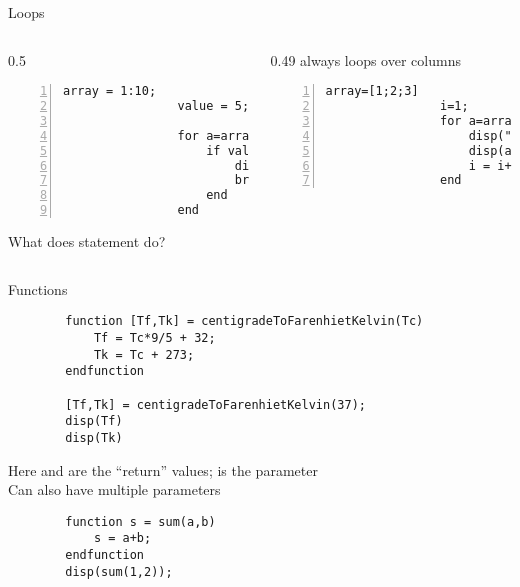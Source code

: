 \begin{frame}[fragile]{Loops}
    \begin{columns}
        \begin{column}{0.5\linewidth}
            \begin{lstlisting}[numbers=left]
                array = 1:10;
                value = 5;
                
                for a=array
                    if value==a then
                        disp("Value exists in array");
                        break;
                    end
                end
            \end{lstlisting}
            What does  statement do?
        \end{column}
        \begin{column}{0.49\linewidth}
            \scilab{} always loops over columns
            \begin{lstlisting}[numbers=left]
                array=[1;2;3]
                i=1;
                for a=array
                    disp("Element " + string(i) + ":")
                    disp(a)
                    i = i+1;
                end
            \end{lstlisting}
        \end{column}
    \end{columns}
\end{frame}

\begin{frame}[fragile]{Functions}
    \begin{lstlisting}
        function [Tf,Tk] = centigradeToFarenhietKelvin(Tc)
            Tf = Tc*9/5 + 32;
            Tk = Tc + 273;
        endfunction
        
        [Tf,Tk] = centigradeToFarenhietKelvin(37);
        disp(Tf)
        disp(Tk)
    \end{lstlisting}
    Here  and  are the ``return'' values;  is the parameter\\[0.5em]
    Can also have multiple parameters
    \begin{lstlisting}
        function s = sum(a,b)
            s = a+b;
        endfunction
        disp(sum(1,2));
    \end{lstlisting}
\end{frame}

